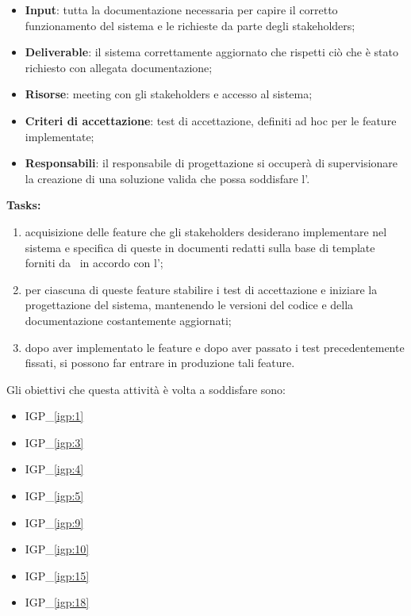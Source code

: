 		\begin{itemize}[noitemsep]
			\renewcommand\labelitemi{--}
			\item \textbf{Input}: tutta la documentazione necessaria per capire il corretto funzionamento del sistema e le richieste da parte degli stakeholders;
			\item \textbf{Deliverable}: il sistema correttamente aggiornato che rispetti ciò che è stato richiesto con allegata documentazione;
			\item \textbf{Risorse}: meeting con gli stakeholders e accesso al sistema;
			\item \textbf{Criteri di accettazione}: test di accettazione, definiti ad hoc per le feature implementate;
			\item \textbf{Responsabili}: il responsabile di progettazione si occuperà di supervisionare la creazione di una soluzione valida che possa soddisfare l'\istituto.
		\end{itemize}
		
		\textbf{Tasks:}
		\begin{enumerate}[noitemsep]
			\item acquisizione delle feature che gli stakeholders desiderano implementare nel sistema e specifica di queste in documenti redatti sulla base di template forniti da \azienda~in accordo con l'\istituto;
			\item per ciascuna di queste feature stabilire i test di accettazione e iniziare la progettazione del sistema, mantenendo le versioni del codice e della documentazione costantemente aggiornati;
			\item dopo aver implementato le feature e dopo aver passato i test precedentemente fissati, si possono far entrare in produzione tali feature.
		\end{enumerate}
	
		Gli obiettivi che questa attività è volta a soddisfare sono:
		\begin{itemize}[noitemsep]
			\renewcommand\labelitemi{--}
			\item {\color{pantone}IGP\_\ref{igp:1}}
			\item {\color{pantone}IGP\_\ref{igp:3}}
			\item {\color{pantone}IGP\_\ref{igp:4}}
			\item {\color{pantone}IGP\_\ref{igp:5}}
			\item {\color{pantone}IGP\_\ref{igp:9}}
			\item {\color{pantone}IGP\_\ref{igp:10}}
			\item {\color{pantone}IGP\_\ref{igp:15}}
			\item {\color{pantone}IGP\_\ref{igp:18}}
		\end{itemize}
	

